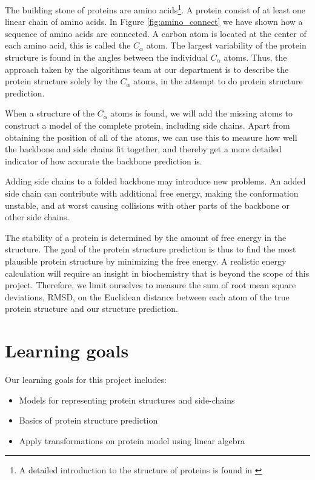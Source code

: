 \documentclass[10pt,a4paper,final,twoside,openany,article]{memoir}
\begin{document}
The building stone of proteins are amino acids\footnote{A detailed
  introduction to the structure of proteins is found in
  \cite{branden}}. A protein consist of at least one linear chain of
amino acids. In Figure \ref{fig:amino_connect} we have shown how a
sequence of amino acids are connected. A carbon atom is located at the
center of each amino acid, this is called the $C_\alpha$ atom. The
largest variability of the protein structure is found in the angles
between the individual $C_\alpha$ atoms. Thus, the approach taken by
the algorithms team at our department is to describe the protein
structure solely by the $C_\alpha$ atoms, in the attempt to do protein
structure prediction.

When a structure of the $C_\alpha$ atoms is found, we will add the missing atoms to construct a model of the complete protein, including side chains. Apart from obtaining the position of all of the atoms, we can use this to measure how well the backbone and side chains fit together, and thereby get a more detailed indicator of how accurate the backbone prediction is.


Adding side chains to a folded backbone may introduce new problems. An
added side chain can contribute with additional free energy, making the
conformation unstable, and at worst causing collisions
with other parts of the backbone or other side chains.


The stability of a protein is determined by the amount of free energy in the structure. 
The goal of the protein structure prediction is thus to find the most plausible protein structure by minimizing the free energy.
A realistic energy calculation will require an insight in biochemistry that is beyond the scope of this project. 
Therefore, we limit ourselves to measure the sum of root mean square deviations, RMSD, on the Euclidean distance between each atom of the true protein structure and our structure prediction.



\section{Learning goals}
Our learning goals for this project includes:
\begin{itemize}
\item Models for representing protein structures and side-chains
\item Basics of protein structure prediction
\item Apply transformations on protein model using linear algebra
\end{itemize}
\end{document}
